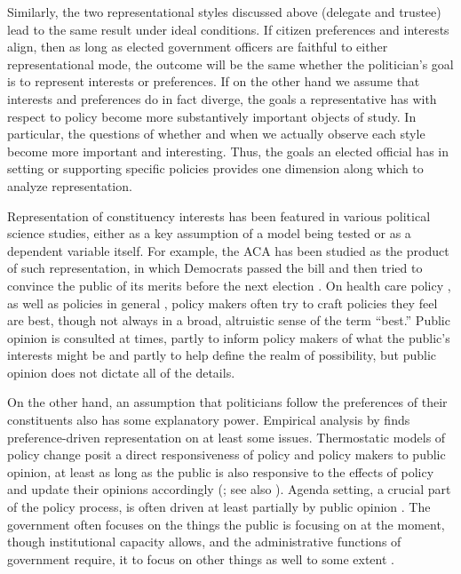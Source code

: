 Similarly, the two representational styles discussed above (delegate and trustee) lead to the same result under ideal conditions. If citizen preferences and interests align, then as long as elected government officers are faithful to either representational mode, the outcome will be the same whether the politician's goal is to represent interests or preferences. If on the other hand we assume that interests and preferences do in fact diverge, the goals a representative has with respect to policy become more substantively important objects of study. In particular, the questions of whether and when we actually observe each style become more important and interesting. Thus, the goals an elected official has in setting or supporting specific policies provides one dimension along which to analyze representation.

Representation of constituency interests has been featured in various political science studies, either as a key assumption of a model being tested or as a dependent variable itself. For example, the ACA has been studied as the product of such representation, in which Democrats passed the bill and then tried to convince the public of its merits before the next election \citep{Starr2011,Bradley2014}. On health care policy \citep{Starr1982,Starr2011,Jacobs1993,Skocpol1996,Marmor1970,Oberlander2003}, as well as policies in general \citep{Jacobs2000,Kingdon1995}, policy makers often try to craft policies they feel are best, though not always in a broad, altruistic sense of the term ``best.'' Public opinion is consulted at times, partly to inform policy makers of what the public's interests might be and partly to help define the realm of possibility, but public opinion does not dictate all of the details.

On the other hand, an assumption that politicians follow the preferences of their constituents also has some explanatory power. Empirical analysis by \citet{Miller1963} finds preference-driven representation on at least some issues. Thermostatic models of policy change posit a direct responsiveness of policy and policy makers to public opinion, at least as long as the public is also responsive to the effects of policy and update their opinions accordingly (\citealt{Soroka2010}; see also \citealt{Oberlander2015}). Agenda setting, a crucial part of the policy process, is often driven at least partially by public opinion \citep{Kingdon1995,Soroka2010,Jones2005,True1999}. The government often focuses on the things the public is focusing on at the moment, though institutional capacity allows, and the administrative functions of government require, it to focus on other things as well to some extent \citep{Kingdon1995,Oberlander2003,Jones2005,True1999}.

